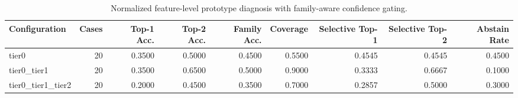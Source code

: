 \begin{table}[t]
\centering
\caption{Normalized feature-level prototype diagnosis with family-aware confidence gating.}
\label{tab:dice_stressor_hierarchical_diagnosis}
\footnotesize
\begin{tabular}{lrrrrrrrr}
\toprule
Configuration & Cases & Top-1 Acc. & Top-2 Acc. & Family Acc. & Coverage & Selective Top-1 & Selective Top-2 & Abstain Rate \\
\midrule
tier0 & 20 & 0.3500 & 0.5000 & 0.4500 & 0.5500 & 0.4545 & 0.4545 & 0.4500 \\
tier0_tier1 & 20 & 0.3500 & 0.6500 & 0.5000 & 0.9000 & 0.3333 & 0.6667 & 0.1000 \\
tier0_tier1_tier2 & 20 & 0.2000 & 0.4500 & 0.3500 & 0.7000 & 0.2857 & 0.5000 & 0.3000 \\
\bottomrule
\end{tabular}

\end{table}
